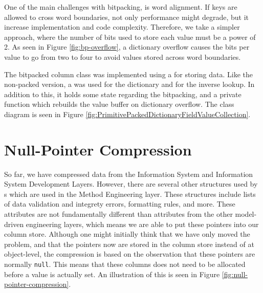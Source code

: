 One of the main challenges with bitpacking, is word alignment. If keys are allowed to cross word boundaries, not only performance might degrade, but it increase implementation and code complexity. Therefore, we take a simpler approach, where the number of bits used to store each value must be a power of 2. As seen in Figure \ref{fig:bp-overflow}, a dictionary overflow causes the bits per value to go from two to four to avoid values stored across word boundaries.

The bitpacked column class was implemented using a  for storing data. Like the non-packed version, a  was used for the dictionary and  for the inverse lookup. In addition to this, it holds some state regarding the bitpacking, and a private function  which rebuilds the value buffer on dictionary overflow. The class diagram is seen in Figure \ref{fig:PrimitivePackedDictionaryFieldValueCollection}.


\section{Null-Pointer Compression}
\label{sec:Null-Pointer Compression}
So far, we have compressed data from the Information System and Information System Development Layers. However, there are several other structures used by s which are used in the Method Engineering layer. These structures include lists of data validation and integrety errors, formatting rules, and more. These attributes are not fundamentally different than attributes from the other model-driven engineering layers, which means we are able to put these pointers into our column store. Although one might initially think that we have only moved the problem, and that the pointers now are stored in the column store instead of at object-level, the compression is based on the observation that these pointers are normally \texttt{null}. This means that these columns does not need to be allocated before a value is actually set. An illustration of this is seen in Figure \ref{fig:null-pointer-compression}.

